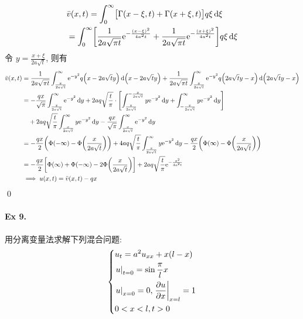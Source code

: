 \begin{solution}
\begin{align*}
&\bar{v}(x, t) = \int_0^\infty
    \bigl[ \Gamma(x-\xi, t) + \Gamma(x+\xi, t) \bigr] q \xi \operatorname{d\!} \xi \\
&= \int_0^\infty
    \biggl[ \frac1{2a\sqrt{\pi t}} {\mathrm e}^{-\frac{(x-\xi)^2}{4a^2t}}
    +\frac1{2a\sqrt{\pi t}} {\mathrm e}^{-\frac{(x+\xi)^2}{4a^2t}} \biggr]
	q \xi \operatorname{d\!} \xi
\end{align*}
令 $y = \frac{x+\xi}{2a\sqrt{t}}$, 则有
\begin{align*}
\bar{v}(x, t)
&= \frac1{2a\sqrt{\pi t}} 
    \int_{\frac{x}{2a\sqrt{t}}}^\infty \me^{-y^2}q
        \mclosure{ x - 2a\sqrt{t} y } \diff \mclosure{ x - 2a\sqrt{t} y }
    +\frac1{2a\sqrt{\pi t}}
    \int_{\frac{x}{2a\sqrt{t}}}^\infty \me^{-y^2}q
        \mclosure{ 2a\sqrt{t} y - x } \diff \mclosure{ 2a\sqrt{t} y - x } \\
&= -\frac{qx}{\sqrt{\pi}} \int_{\frac{x}{2a\sqrt{t}}}^\infty \me^{-y^2} \diff y
    + 2aq\sqrt{\frac{t}{\pi}} \cdot \Biggl[
        \int_{\frac{x}{2a\sqrt{t}}}^{-\frac{x}{2a\sqrt{t}}} y\me^{-y^2}\diff y
        + \int_{-\frac{x}{2a\sqrt{t}}}^\infty y\me^{-y^2}\diff y \Biggr] \\
    &\quad+ 2aq\sqrt{\frac{t}{\pi}}
	    \int_{\frac{x}{2a\sqrt{t}}}^\infty y\me^{-y^2}\diff y
        - \frac{qx}{\sqrt{\pi}} \int_{\frac{x}{2a\sqrt{t}}}^\infty
		\me^{-y^2} \diff y \\
&= -\frac{qx}{2}\mclosure{\Phi(-\infty) - \Phi\mclosure{\frac{x}{2a\sqrt{t}}}}
    + 4aq\sqrt{\frac{t}{\pi}}
    \int_{\frac{x}{2a\sqrt{t}}}^\infty y\me^{-y^2} \diff y
        - \frac{qx}{2}\mclosure{\Phi(\infty)
		- \Phi\mclosure{\frac{x}{2a\sqrt{t}}}}\\
&= -\frac{qx}{2}\biggl[ \Phi(\infty) + \Phi(-\infty)
    - 2\Phi\mclosure{\frac{x}{2a\sqrt{t}}} \biggr]
    + 2aq\sqrt{\frac{t}{\pi}} \me^{-\frac{x^2}{4a^2t}} \\
&\implies u(x, t) = \bar{v}(x, t) - qx
\end{align*}
\qed
\end{solution}
\paragraph{Ex 9.}
用分离变量法求解下列混合问题:
\[ \begin{dcases}
u_t = a^2 u_{xx} + x(l-x) \\
{\left.{u} \right|}_{t=0} = \sin \dfrac{\pi}{l} x \\
{\left.{u} \right|}_{x=0} = 0, {\left.{{\dfrac{\partial {u}}{\partial {x}}}} \right|}_{x=l} = 1 \\
0 < x < l, t > 0
\end{dcases} \]

